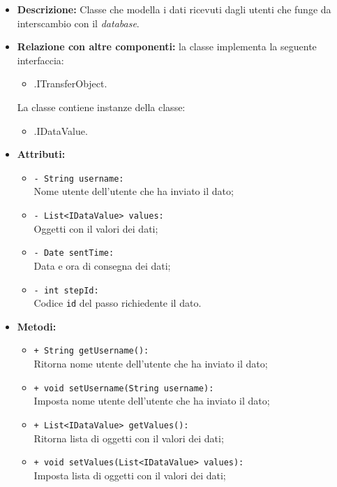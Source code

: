 \begin{flushleft}
\begin{itemize}
\item \textbf{Descrizione:} Classe che modella i dati ricevuti dagli utenti che funge da interscambio  con il \textit{database}.
\item \textbf{Relazione con altre componenti:} la classe implementa la seguente interfaccia:
		\begin{itemize}
			\item \smodel{}.ITransferObject.
		\end{itemize}
				La classe contiene instanze della classe:
		\begin{itemize}
			\item \smodel{}.IDataValue.
		\end{itemize}
\item \textbf{Attributi:}
\begin{sloppypar}
\begin{itemize}
\item \texttt{- String username:}\\ Nome utente dell'utente che ha inviato il dato;
\item \texttt{- List<IDataValue> values:}\\ Oggetti con il valori dei dati;
\item \texttt{- Date sentTime:}\\ Data e ora di consegna dei dati;
\item \texttt{- int stepId:}\\ Codice \texttt{id} del passo richiedente il dato.
\end{itemize}
\end{sloppypar}
\item \textbf{Metodi:}
\begin{sloppypar}
\begin{itemize}
\item \texttt{+ String getUsername():}\\ Ritorna nome utente dell'utente che ha inviato il dato;
\item \texttt{+ void setUsername(String username):}\\ Imposta nome utente dell'utente che ha inviato il dato;
\item \texttt{+ List<IDataValue> getValues():}\\ Ritorna lista di oggetti con il valori dei dati;
\item \texttt{+ void setValues(List<IDataValue> values):}\\ Imposta lista di oggetti con il valori dei dati;

\end{itemize}
\end{sloppypar}
\end{itemize}
\end{flushleft}
